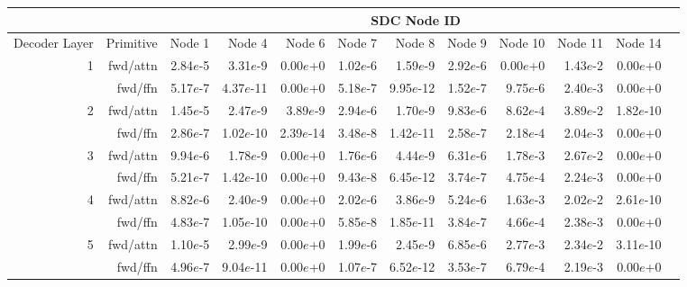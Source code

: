 


\begin{table*}[t]


\begin{center}
\begin{tiny}
\begin{sc}

\begin{tabular}{rrrrrrrrrrrr}
\toprule
& & \multicolumn{9}{c}{SDC Node ID} \\
\midrule
Decoder Layer & Primitive  & Node 1       & Node 4         & Node 6        & Node 7       & Node 8        & Node 9       & Node 10      & Node 11      & Node 14       \\
\midrule
\multirow{2}{*}{1}     & fwd/attn         & 2.84$e$-5 & 3.31$e$-9  & 0.00$e$+0  & 1.02$e$-6 & 1.59$e$-9  & 2.92$e$-6 & 0.00$e$+0 & 1.43$e$-2 & 0.00$e$+0  \\
        & fwd/ffn          & 5.17$e$-7 & 4.37$e$-11 & 0.00$e$+0  & 5.18$e$-7 & 9.95$e$-12 & 1.52$e$-7 & 9.75$e$-6 & 2.40$e$-3 & 0.00$e$+0  \\
\midrule
\multirow{2}{*}{2}       & fwd/attn         & 1.45$e$-5 & 2.47$e$-9  & 3.89$e$-9  & 2.94$e$-6 & 1.70$e$-9  & 9.83$e$-6 & 8.62$e$-4 & 3.89$e$-2 & 1.82$e$-10 \\
        & fwd/ffn          & 2.86$e$-7 & 1.02$e$-10 & 2.39$e$-14 & 3.48$e$-8 & 1.42$e$-11 & 2.58$e$-7 & 2.18$e$-4 & 2.04$e$-3 & 0.00$e$+0  \\
\midrule
\multirow{2}{*}{3}      & fwd/attn         & 9.94$e$-6 & 1.78$e$-9  & 0.00$e$+0  & 1.76$e$-6 & 4.44$e$-9  & 6.31$e$-6 & 1.78$e$-3 & 2.67$e$-2 & 0.00$e$+0  \\
        & fwd/ffn          & 5.21$e$-7 & 1.42$e$-10 & 0.00$e$+0  & 9.43$e$-8 & 6.45$e$-12 & 3.74$e$-7 & 4.75$e$-4 & 2.24$e$-3 & 0.00$e$+0  \\
\midrule
\multirow{2}{*}{4}     & fwd/attn         & 8.82$e$-6 & 2.40$e$-9  & 0.00$e$+0  & 2.02$e$-6 & 3.86$e$-9  & 5.24$e$-6 & 1.63$e$-3 & 2.02$e$-2 & 2.61$e$-10 \\
        & fwd/ffn          & 4.83$e$-7 & 1.05$e$-10 & 0.00$e$+0  & 5.85$e$-8 & 1.85$e$-11 & 3.84$e$-7 & 4.66$e$-4 & 2.38$e$-3 & 0.00$e$+0  \\
\midrule
\multirow{2}{*}{5}      & fwd/attn         & 1.10$e$-5 & 2.99$e$-9  & 0.00$e$+0  & 1.99$e$-6 & 2.45$e$-9  & 6.85$e$-6 & 2.77$e$-3 & 2.34$e$-2 & 3.11$e$-10 \\
        & fwd/ffn          & 4.96$e$-7 & 9.04$e$-11 & 0.00$e$+0  & 1.07$e$-7 & 6.52$e$-12 & 3.53$e$-7 & 6.79$e$-4 & 2.19$e$-3 & 0.00$e$+0  \\

\end{tabular}
\end{sc}
\end{tiny}
\end{center}
\end{table*}
